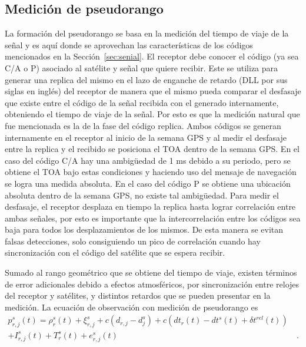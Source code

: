 \documentclass[a4paper,12pt,oneside,onecolumn,final,openright]{book}%
\begin{document}
\subsection{Medición de pseudorango}
	La formación del pseudorango se basa en la medición del tiempo de viaje de la señal y es aquí donde se aprovechan las características de los códigos mencionados en la Sección~\ref{sec:senial}. El receptor debe conocer el código (ya sea C/A o P) asociado al satélite y señal que quiere recibir. Este se utiliza para generar una replica del mismo en el lazo de enganche de retardo (DLL por sus siglas en inglés) del receptor de manera que el mismo pueda comparar el desfasaje que existe entre el código de la señal recibida con el generado internamente, obteniendo el tiempo de viaje de la señal. Por esto es que la medición natural que fue mencionada es la de la fase del código replica. Ambos códigos se generan internamente en el receptor al inicio de la semana GPS y al medir el desfasaje entre la replica y el recibido se posiciona el TOA dentro de la semana GPS. En el caso del código C/A hay una ambigüedad de 1 ms debido a su periodo, pero se obtiene el TOA bajo estas condiciones y haciendo uso del mensaje de navegación se logra una medida absoluta. En el caso del código P se obtiene una ubicación absoluta dentro de la semana GPS, no existe tal ambigüedad. Para medir el desfasaje, el receptor desplaza en tiempo la replica hasta lograr correlación entre ambas señales, por esto es importante que la intercorrelación entre los códigos sea baja para todos los desplazamientos de los mismos. De esta manera se evitan falsas detecciones, solo consiguiendo un pico de correlación cuando hay sincronización con el código del satélite que se espera recibir.
	
	Sumado al rango geométrico que se obtiene del tiempo de viaje, existen términos de error adicionales debido a efectos atmosféricos, por sincronización entre relojes del receptor y satélites, y distintos retardos que se pueden presentar en la medición. La ecuación de observación con medición de pseudorango es 
\begin{align}\label{ec:obs_pseudorango}
	p_{r,j}^s(t) = \rho_r^s(t) + \xi_{r,j}^s + c\left(d_{r,j}-d_j^s\right) + c\left(dt_r(t)-dt^s(t)+\delta t^{rel}(t)\right)& \\ 
	+ I_{r,j}^s(t) + T_r^s(t) +e_{r,j}^s(t)& \ . \nonumber
\end{align}
\end{document}
